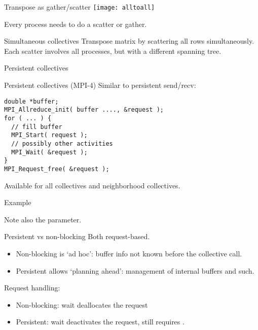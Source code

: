 \begin{numberedframe}{Transpose as gather/scatter}
  \texttt{[image: alltoall]}

  Every process needs to do a scatter or gather.
\end{numberedframe}

\begin{numberedframe}{Simultaneous collectives}
  Transpose matrix by scattering all rows simultaneously.\\
  Each scatter involves all processes, but with a
  different spanning tree.

\end{numberedframe}

 {Persistent collectives}

\begin{numberedframe}{Persistent collectives (MPI-4)}
  Similar to persistent send/recv:
\begin{lstlisting}
double *buffer;
MPI_Allreduce_init( buffer ...., &request );
for ( ... ) {
  // fill buffer
  MPI_Start( request );
  // possibly other activities
  MPI_Wait( &request );
}
MPI_Request_free( &request );
\end{lstlisting}
Available for all collectives and neighborhood collectives.
\end{numberedframe}

\begin{numberedframe}{Example}

  Note also the  parameter.
\end{numberedframe}

\begin{numberedframe}{Persistent vs non-blocking}
  Both request-based.
  \begin{itemize}
  \item Non-blocking is `ad hoc': buffer info not known before the collective call.
  \item Persistent allows `planning ahead': management of internal buffers and such.
  \end{itemize}
  Request handling:
  \begin{itemize}
  \item Non-blocking: wait deallocates the request
  \item Persistent: wait deactivates the request,
    still requires .
  \end{itemize}
\end{numberedframe}

